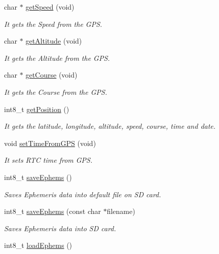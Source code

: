 \begin{DoxyCompactItemize}
char $\ast$ \hyperlink{class_wasp_g_p_s_ac595e50d499c0384d2936926e3a791b7}{get\+Speed} (void)
\begin{DoxyCompactList}\small\item\em It gets the Speed from the G\+PS. \end{DoxyCompactList}\item 
char $\ast$ \hyperlink{class_wasp_g_p_s_a4286f04d384c095f467f7f4e68970b52}{get\+Altitude} (void)
\begin{DoxyCompactList}\small\item\em It gets the Altitude from the G\+PS. \end{DoxyCompactList}\item 
char $\ast$ \hyperlink{class_wasp_g_p_s_a4a5435eb1a294e2d0dee84e949a9abc1}{get\+Course} (void)
\begin{DoxyCompactList}\small\item\em It gets the Course from the G\+PS. \end{DoxyCompactList}\item 
int8\+\_\+t \hyperlink{class_wasp_g_p_s_a2dedd359ffb9df0eb4fa9a9bae8b04b6}{get\+Position} ()
\begin{DoxyCompactList}\small\item\em It gets the latitude, longitude, altitude, speed, course, time and date. \end{DoxyCompactList}\item 
void \hyperlink{class_wasp_g_p_s_a49796d04b8934a7cc350218123a5e697}{set\+Time\+From\+G\+PS} (void)
\begin{DoxyCompactList}\small\item\em It sets R\+TC time from G\+PS. \end{DoxyCompactList}\item 
int8\+\_\+t \hyperlink{class_wasp_g_p_s_ad733fb9fb2832ac4f82651ada25c62cc}{save\+Ephems} ()
\begin{DoxyCompactList}\small\item\em Saves Ephemeris data into default file on SD card. \end{DoxyCompactList}\item 
int8\+\_\+t \hyperlink{class_wasp_g_p_s_aba008b17da237045d38b14b7e4685471}{save\+Ephems} (const char $\ast$filename)
\begin{DoxyCompactList}\small\item\em Saves Ephemeris data into SD card. \end{DoxyCompactList}\item 
int8\+\_\+t \hyperlink{class_wasp_g_p_s_a6be042ba4f2b51951f57e3ba408a6766}{load\+Ephems} ()

\end{DoxyCompactItemize}
